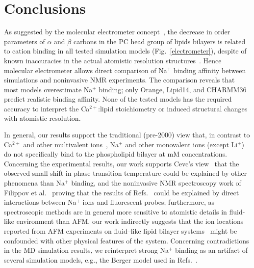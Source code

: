\documentclass[twoside,twocolumn,9pt]{article}
\begin{document}
\section{Conclusions}
As suggested by the molecular electrometer concept~\cite{akutsu81,altenbach84,seelig87,scherer89},
the decrease in order parameters of $\alpha$ and $\beta$ carbons in the PC head group of lipids bilayers
is related to cation binding  in all tested simulation models (Fig.~\ref{electrometer}), despite of known inaccuracies 
in the actual atomistic resolution structures~\cite{botan15}. Hence molecular electrometer allows direct comparison
of Na$^+$ binding affinity between simulations and noninvasive NMR experiments.
The comparison reveals that most models overestimate Na$^+$ binding; only Orange, Lipid14, and CHARMM36 
predict realistic binding affinity. None of the tested models has the required accuracy to interpret
the Ca$^{2+}$:lipid stoichiometry or induced structural changes with atomistic resolution.

In general, our results support the traditional (pre-2000) view that, in contrast to Ca$^{2+}$ and other multivalent ions~\cite{eisenberg79,akutsu81,altenbach84,tatulian87,cevc90,tocanne90,clarke99,binder02,pabst07,filippov09},
Na$^+$ and other monovalent ions (except Li$^+$) do not specifically bind to the phospholipid bilayer at mM concentrations.
Concerning the experimental results, our work supports Cevc's view~\cite{cevc90}
that the observed small shift in phase transition temperature could be explained by other phenomena than Na$^+$ binding, and the noninvasive NMR spectroscopy work of Filippov et al.~\cite{filippov09} 
proving that the results of Refs.~\cite{bockmann03,vacha09a,harb13} could be explained by direct interactions between Na$^+$ ions and fluorescent probes;
furthermore, as spectroscopic methods are in general more sensitive to atomistic details in fluid-like environment than AFM, our work indirectly suggests that the ion locations reported from AFM experiments on fluid--like lipid bilayer systems~\cite{manyes05,manyes06,fukuma07,ferber11,morata12} might be confounded with other physical features of the system.
Concerning contradictions in the MD simulation results, we reinterpret strong Na$^+$ binding as an artifact of several simulation models, e.g., the Berger model used in Refs.~\cite{bockmann03,bockmann04}.
\end{document}
